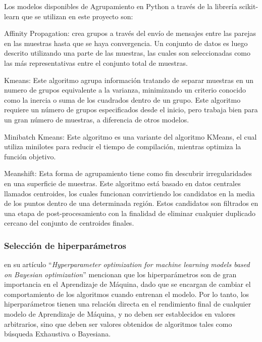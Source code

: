 Los modelos disponibles de Agrupamiento en Python a través de la librería scikit-learn \parencite{sklearn_api} que se utilizan en este proyecto son:

\begin{APAitemize}
    \item Affinity Propagation: crea grupos a través del envío de mensajes entre las parejas en las muestras hasta que se haya convergencia. Un conjunto de datos es luego descrito utilizando una parte de las muestras, las cuales son seleccionadas como las más representativas entre el conjunto total de muestras.
    \item Kmeans: Este algoritmo agrupa información tratando de separar muestras en un numero de grupos equivalente a la varianza, minimizando un criterio conocido como la inercia o suma de los cuadrados dentro de un grupo. Este algoritmo requiere un número de grupos especificados desde el inicio, pero trabaja bien para un gran número de muestras, a diferencia de otros modelos.
    \item Minibatch Kmeans: Este algoritmo es una variante del algoritmo KMeans, el cual utiliza minilotes para reducir el tiempo de compilación, mientras optimiza la función objetivo.
    \item Meanshift: Esta forma de agrupamiento tiene como fin descubrir irregularidades en una superficie de muestras. Este algoritmo está basado en datos centrales llamados centroides, los cuales funcionan convirtiendo los candidatos en la media de los puntos dentro de una determinada región. Estos candidatos son filtrados en una etapa de post-procesamiento con la finalidad de eliminar cualquier duplicado cercano del conjunto de centroides finales.
\end{APAitemize}

\subsubsection{Selección de hiperparámetros}
\textcite{Wu2019} en su artículo \enquote{\textit{Hyperparameter optimization for machine learning models based on Bayesian optimization}} mencionan que los hiperparámetros son de gran importancia en el Aprendizaje de Máquina, dado que se encargan de cambiar el comportamiento de los algoritmos cuando entrenan el modelo. Por lo tanto, los hiperparámetros tienen una relación directa en el rendimiento final de cualquier modelo de Aprendizaje de Máquina, y no deben ser establecidos en valores arbitrarios, sino que deben ser valores obtenidos de algoritmos tales como búsqueda Exhaustiva o Bayesiana.

